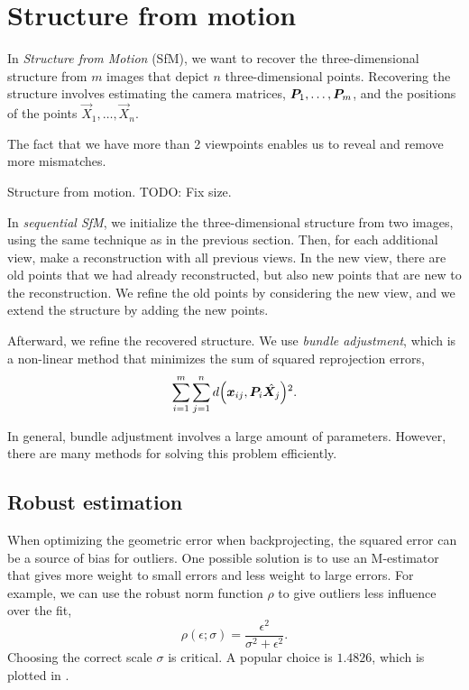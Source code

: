 \section{Structure from motion} \label{sec:sfm}

In \textit{Structure from Motion} (SfM), we want to recover the
three-dimensional structure from $m$ images that depict $n$ three-dimensional
points. Recovering the structure involves estimating the camera matrices,
$\bm{P}_1, \ldots, \bm{P}_m$, and the positions of the points $\vec{X}_1,
\ldots, \vec{X}_n$.

The fact that we have more than 2 viewpoints enables us to reveal and remove
more mismatches.

\begin{marginfigure}
    \centering
    \caption{Structure from motion. TODO: Fix size.}
    \label{fig:structure-from-motion}
\end{marginfigure}

In \textit{sequential SfM}, we initialize the three-dimensional structure from
two images, using the same technique as in the previous section. Then, for each
additional view, make a reconstruction with all previous views. In the new
view, there are old points that we had already reconstructed, but also new
points that are new to the reconstruction. We refine the old points by
considering the new view, and we extend the structure by adding the new points.

Afterward, we refine the recovered structure. We use \textit{bundle
adjustment}, which is a non-linear method that minimizes the sum of squared
reprojection errors, \[
  \sum_{i=1}^m \sum_{j=1}^n d \lft( \vec{x}_{ij}, \mat{P}_i \hat{\mat{X}_j} \rgt)^2
.\]

In general, bundle adjustment involves a large amount of parameters. However,
there are many methods for solving this problem efficiently.

\subsection{Robust estimation}

When optimizing the geometric error when backprojecting, the squared error can
be a source of bias for outliers. One possible solution is to use an
M-estimator that gives more weight to small errors and less weight to large
errors. For example, we can use the robust norm function $\rho$ to give
outliers less influence over the fit, \[
  \rho(\epsilon; \sigma) = \frac{\epsilon^2}{\sigma^2 + \epsilon^2}
.\]
Choosing the correct scale $\sigma$ is critical. A popular choice is $1.4826$,
which is plotted in .

